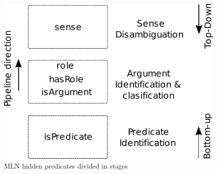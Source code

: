 \begin{figure}
\begin{center}
    \includegraphics[scale=.70]{TaskArchitecture}
\end{center}
\caption{MLN hidden predicates divided in stages}
\label{fig:achitecture}
\end{figure}

